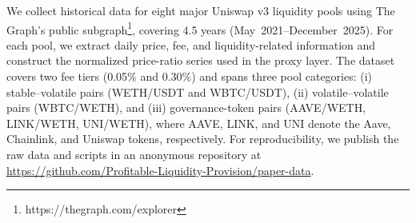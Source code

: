 \documentclass[anonymous]{lipics-v2021}
\begin{document}
{\begin{table}[t]
\centering
\scriptsize
{}
\caption{Summary of Uniswap v3 pools used in the empirical analysis. }
\label{tab:pools}
\end{table}

We collect historical data for eight major Uniswap v3 liquidity pools using The Graph's public subgraph\footnote{https://thegraph.com/explorer}, covering 4.5 years (May~2021--December~2025). For each pool, we extract daily price, fee, and liquidity-related information and construct the normalized price-ratio series used in the proxy layer. The dataset covers two fee tiers (0.05\% and 0.30\%) and spans three pool categories: (i) stable--volatile pairs (WETH/USDT and WBTC/USDT), (ii) volatile--volatile pairs (WBTC/WETH), and (iii) governance-token pairs (AAVE/WETH, LINK/WETH, UNI/WETH), where AAVE, LINK, and UNI denote the Aave, Chainlink, and Uniswap tokens, respectively.
For reproducibility, we publish the raw data and scripts in an anonymous repository at \url{https://github.com/Profitable-Liquidity-Provision/paper-data}. 


}
\end{document}
